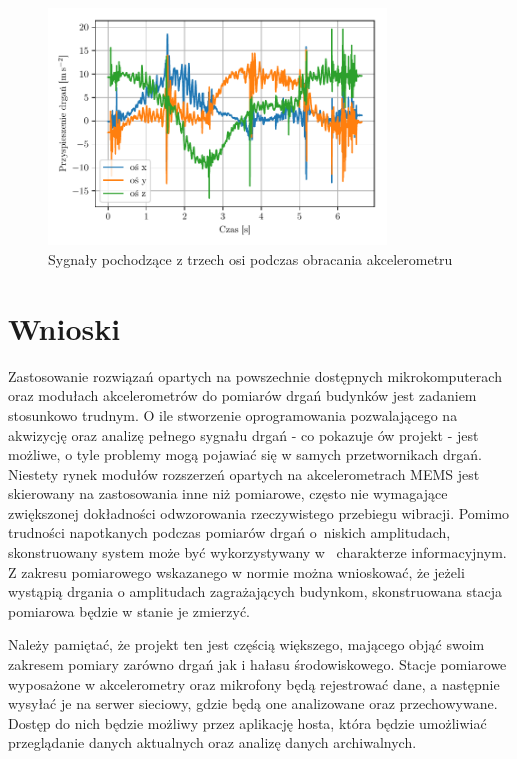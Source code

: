 \documentclass[a4paper,12pt]{mwart}
\let\Oldsection\section
\renewcommand{\section}{\FloatBarrier\Oldsection}
\begin{document}
\begin{figure}[!tbh]
  \centering
  \includegraphics[width=0.8\textwidth]{./plots/accel_2_xyz.pdf}
  \caption{Sygnały pochodzące z trzech osi podczas obracania akcelerometru}
  \label{plot:accel_2_xyz}
\end{figure}

\section{Wnioski}

Zastosowanie rozwiązań opartych na powszechnie dostępnych mikrokomputerach oraz
modułach akcelerometrów do pomiarów drgań budynków jest zadaniem stosunkowo
trudnym. O ile stworzenie oprogramowania pozwalającego na akwizycję oraz analizę
pełnego sygnału drgań - co pokazuje ów projekt - jest możliwe, o tyle problemy
mogą pojawiać się w samych przetwornikach drgań. Niestety rynek modułów
rozszerzeń opartych na akcelerometrach MEMS jest skierowany na zastosowania inne
niż pomiarowe, często nie wymagające zwiększonej dokładności odwzorowania
rzeczywistego przebiegu wibracji. Pomimo trudności napotkanych podczas pomiarów
drgań o~niskich amplitudach, skonstruowany system może być wykorzystywany w~%
charakterze informacyjnym. Z zakresu pomiarowego wskazanego w normie można
wnioskować, że jeżeli wystąpią drgania o amplitudach zagrażających budynkom,
skonstruowana stacja pomiarowa będzie w stanie je zmierzyć.

Należy pamiętać, że projekt ten jest częścią większego, mającego objąć swoim
zakresem pomiary zarówno drgań jak i hałasu środowiskowego. Stacje pomiarowe
wyposażone w akcelerometry oraz mikrofony będą rejestrować dane, a następnie
wysyłać je na serwer sieciowy, gdzie będą one analizowane oraz przechowywane.
Dostęp do nich będzie możliwy przez aplikację hosta, która będzie umożliwiać
przeglądanie danych aktualnych oraz analizę danych archiwalnych.


\end{document}
